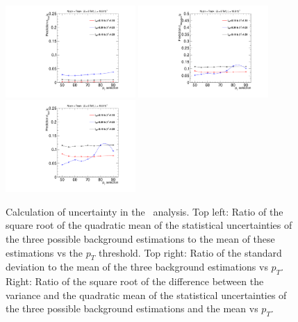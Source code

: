 \begin{figure}
\begin{center}
\includegraphics[clip=true, trim=0.0cm 0cm 3.0cm 0cm,width=0.44\textwidth]{figures/tkmu/Systematics_Data8TeV_pT_Stat}
\includegraphics[clip=true, trim=0.0cm 0cm 3.0cm 0cm,width=0.44\textwidth]{figures/tkmu/Systematics_Data8TeV_pT_Sum} \\
\includegraphics[clip=true, trim=0.0cm 0cm 3.0cm 0cm,width=0.44\textwidth]{figures/tkmu/Systematics_Data8TeV_pT_Syst}
\caption[Statistical and systematic uncertainty in the background prediction for different sets of thresholds in the \tktof\ analysis.]
{Calculation of uncertainty in the \tktof\ analysis.
Top left: Ratio of the square root of the quadratic
mean of the statistical uncertainties of the three possible background
estimations to the mean of these estimations vs
the $p_T$ threshold. Top right: Ratio of the standard deviation to the mean of the three
background estimations vs $p_T$. Right: Ratio of the
square root of the difference between the variance and the quadratic
mean of the statistical uncertainties  of the three possible background
estimations and the mean vs $p_T$.
}
\label{fig:TkMuUnc}
\end{center}
\end{figure}

